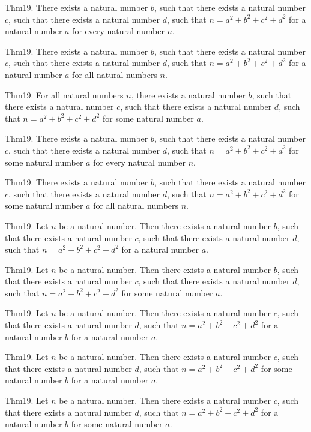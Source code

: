 \documentclass{article}
\begin{document}
Thm19. There exists a natural number $b$, such that there exists a natural number $c$, such that there exists a natural number $d$, such that $n = a ^{ 2}+ b ^{ 2}+ c ^{ 2}+ d ^{ 2}$ for a natural number $a$ for every natural number $n$.

Thm19. There exists a natural number $b$, such that there exists a natural number $c$, such that there exists a natural number $d$, such that $n = a ^{ 2}+ b ^{ 2}+ c ^{ 2}+ d ^{ 2}$ for a natural number $a$ for all natural numbers $n$.

Thm19. For all natural numbers $n$, there exists a natural number $b$, such that there exists a natural number $c$, such that there exists a natural number $d$, such that $n = a ^{ 2}+ b ^{ 2}+ c ^{ 2}+ d ^{ 2}$ for some natural number $a$.

Thm19. There exists a natural number $b$, such that there exists a natural number $c$, such that there exists a natural number $d$, such that $n = a ^{ 2}+ b ^{ 2}+ c ^{ 2}+ d ^{ 2}$ for some natural number $a$ for every natural number $n$.

Thm19. There exists a natural number $b$, such that there exists a natural number $c$, such that there exists a natural number $d$, such that $n = a ^{ 2}+ b ^{ 2}+ c ^{ 2}+ d ^{ 2}$ for some natural number $a$ for all natural numbers $n$.

Thm19. Let $n$ be a natural number. Then there exists a natural number $b$, such that there exists a natural number $c$, such that there exists a natural number $d$, such that $n = a ^{ 2}+ b ^{ 2}+ c ^{ 2}+ d ^{ 2}$ for a natural number $a$.

Thm19. Let $n$ be a natural number. Then there exists a natural number $b$, such that there exists a natural number $c$, such that there exists a natural number $d$, such that $n = a ^{ 2}+ b ^{ 2}+ c ^{ 2}+ d ^{ 2}$ for some natural number $a$.

Thm19. Let $n$ be a natural number. Then there exists a natural number $c$, such that there exists a natural number $d$, such that $n = a ^{ 2}+ b ^{ 2}+ c ^{ 2}+ d ^{ 2}$ for a natural number $b$ for a natural number $a$.

Thm19. Let $n$ be a natural number. Then there exists a natural number $c$, such that there exists a natural number $d$, such that $n = a ^{ 2}+ b ^{ 2}+ c ^{ 2}+ d ^{ 2}$ for some natural number $b$ for a natural number $a$.

Thm19. Let $n$ be a natural number. Then there exists a natural number $c$, such that there exists a natural number $d$, such that $n = a ^{ 2}+ b ^{ 2}+ c ^{ 2}+ d ^{ 2}$ for a natural number $b$ for some natural number $a$.
\end{document}
